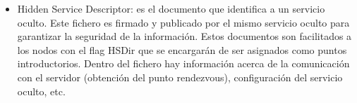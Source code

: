 \begin{itemize}
	\item Hidden Service Descriptor: es el documento que identifica a un servicio oculto. Este fichero es firmado y publicado por el mismo servicio oculto para garantizar la seguridad de la información. Estos documentos son facilitados a los nodos con el flag HSDir que se encargarán de ser asignados como puntos introductorios. Dentro del fichero hay información acerca de la comunicación con el servidor (obtención del punto rendezvous), configuración del servicio oculto, etc.
\end{itemize}